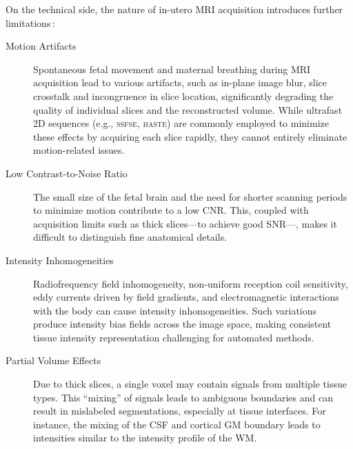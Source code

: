 On the technical side, the nature of in-utero MRI acquisition introduces further limitations\,\cite{Ciceri2023}:
\begin{description}
    \item[Motion Artifacts] Spontaneous fetal movement and maternal breathing during MRI acquisition lead to various artifacts, such as in-plane image blur, slice crosstalk and incongruence in slice location, significantly degrading the quality of individual slices and the reconstructed volume. While ultrafast 2D sequences (e.g., \textsc{ssfse}, \textsc{haste}) are commonly employed to minimize these effects by acquiring each slice rapidly, they cannot entirely eliminate motion-related issues.
    \item[Low Contrast-to-Noise Ratio] The small size of the fetal brain and the need for shorter scanning periods to minimize motion contribute to a low CNR. This, coupled with acquisition limits such as thick slices---to achieve good SNR---, makes it difficult to distinguish fine anatomical details.
    \item[Intensity Inhomogeneities] Radiofrequency field inhomogeneity, non-uniform reception coil sensitivity, eddy currents driven by field gradients, and electromagnetic interactions with the body can cause intensity inhomogeneities. Such variations produce intensity bias fields across the image space, making consistent tissue intensity representation challenging for automated methods.
    \item[Partial Volume Effects] Due to thick slices, a single voxel may contain signals from multiple tissue types. This \enquote{mixing} of signals leads to ambiguous boundaries and can result in mislabeled segmentations, especially at tissue interfaces. For instance, the mixing of the CSF and cortical GM boundary leads to intensities similar to the intensity profile of the WM.
\end{description}

